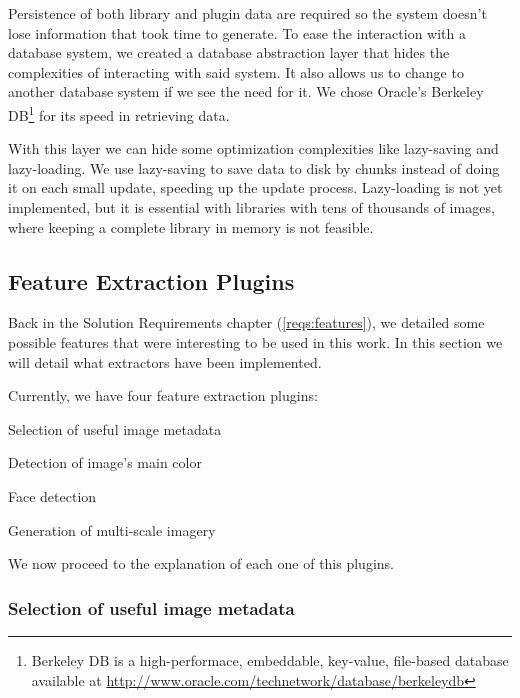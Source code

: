 Persistence of both library and plugin data are required so the system doesn't lose information that took time to generate. To ease the interaction with a database system, we created a database abstraction layer that hides the complexities of interacting with said system. It also allows us to change to another database system if we see the need for it. We chose Oracle's Berkeley DB\footnote{Berkeley DB is a high-performace, embeddable, key-value, file-based database available at \url{http://www.oracle.com/technetwork/database/berkeleydb}} for its speed in retrieving data.

With this layer we can hide some optimization complexities like lazy-saving and lazy-loading. We use lazy-saving to save data to disk by chunks instead of doing it on each small update, speeding up the update process. Lazy-loading is not yet implemented, but it is essential with libraries with tens of thousands of images, where keeping a complete library in memory is not feasible.














\subsection{Feature Extraction Plugins} %
\label{sub:plugins}

Back in the Solution Requirements chapter (\ref{reqs:features}), we detailed some possible features that were interesting to be used in this work. In this section we will detail what extractors have been implemented.

Currently, we have four feature extraction plugins:
\begin{myitemize}
	\item Selection of useful image metadata
	\item Detection of image’s main color
	\item Face detection
	\item Generation of multi-scale imagery
\end{myitemize}

We now proceed to the explanation of each one of this plugins. 

\subsubsection{Selection of useful image metadata}

